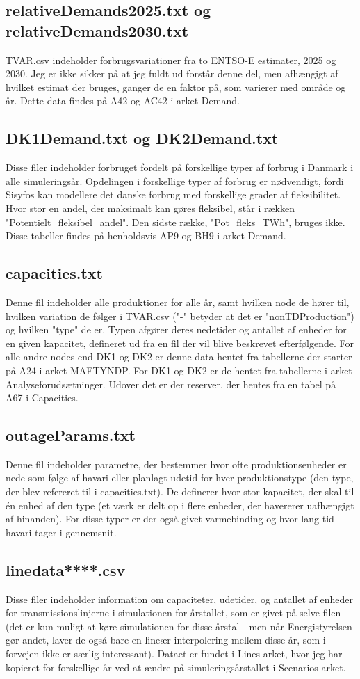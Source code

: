 \documentclass{article}
\begin{document}
 \subsection{relativeDemands2025.txt og relativeDemands2030.txt}
TVAR.csv indeholder forbrugsvariationer fra to ENTSO-E estimater, 2025 og 2030. Jeg er ikke sikker på at jeg fuldt ud forstår denne del, men afhængigt af hvilket estimat der bruges, ganger de en faktor på, som varierer med område og år. Dette data findes på A42 og AC42 i arket Demand. 
\subsection{DK1Demand.txt og DK2Demand.txt}
Disse filer indeholder forbruget fordelt på forskellige typer af forbrug i Danmark i alle simuleringsår. Opdelingen i forskellige typer af forbrug er nødvendigt, fordi Sisyfos kan modellere det danske forbrug med forskellige grader af fleksibilitet. Hvor stor en andel, der maksimalt kan gøres fleksibel, står i rækken "Potentielt\_fleksibel\_andel". Den sidste række, "Pot\_fleks\_TWh", bruges ikke. Disse tabeller findes på henholdsvis AP9 og BH9 i arket Demand.
\subsection{capacities.txt}
Denne fil indeholder alle produktioner for alle år, samt hvilken node de hører til, hvilken variation de følger i TVAR.csv ("-" betyder at det er "nonTDProduction") og hvilken "type" de er. Typen afgører deres nedetider og antallet af enheder for en given kapacitet, defineret ud fra en fil der vil blive beskrevet efterfølgende. For alle andre nodes end DK1 og DK2 er denne data hentet fra tabellerne der starter på A24 i arket MAFTYNDP. For DK1 og DK2 er de hentet fra tabellerne i arket Analyseforudsætninger. Udover det er der reserver, der hentes fra en tabel på A67 i Capacities. 
\subsection{outageParams.txt}
Denne fil indeholder parametre, der bestemmer hvor ofte produktionsenheder er nede som følge af havari eller planlagt udetid for hver produktionstype (den type, der blev refereret til i capacities.txt). De definerer hvor stor kapacitet, der skal til én enhed af den type (et værk er delt op i flere enheder, der havererer uafhængigt af hinanden). For disse typer er der også givet varmebinding og hvor lang tid havari tager i gennemsnit. 
\subsection{linedata****.csv}
Disse filer indeholder information om capaciteter, udetider, og antallet af enheder for transmissionslinjerne i simulationen for årstallet, som er givet på selve filen (det er kun muligt at køre simulationen for disse årstal - men når Energistyrelsen gør andet, laver de også bare en lineær interpolering mellem disse år, som i forvejen ikke er særlig interessant). Dataet er fundet i Lines-arket, hvor jeg har kopieret for forskellige år ved at ændre på simuleringsårstallet i Scenarios-arket.
\end{document}

